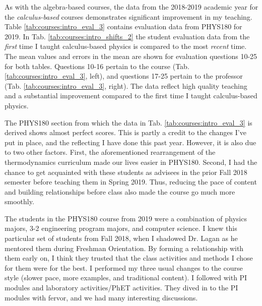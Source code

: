 \documentclass[../../main.tex]{subfiles}
\begin{document}
As with the algebra-based courses, the data from the 2018-2019 academic year for the \textit{calculus-based} courses demonstrates significant improvement in my teaching.  Table \ref{tab:courses:intro_eval_3} contains evaluation data from PHYS180 for 2019.  In Tab. \ref{tab:courses:intro_shifts_2} the student evaluation data from the \textit{first} time I taught calculus-based physics is compared to the most \textit{recent} time.  The mean values and errors in the mean are shown for evaluation questions 10-25 for both tables.  Questions 10-16 pertain to the course (Tab. \ref{tab:courses:intro_eval_3}, left), and questions 17-25 pertain to the professor (Tab. \ref{tab:courses:intro_eval_3}, right).  The data reflect high quality teaching and a substantial improvement compared to the first time I taught calculus-based physics. \\ \hspace{0.1cm}

The PHYS180 section from which the data in Tab. \ref{tab:courses:intro_eval_3} is derived shows almost perfect scores.  This is partly a credit to the changes I've put in place, and the reflecting I have done this past year.  However, it is also due to two other factors.  First, the aforementioned rearrangement of the thermodynamics curriculum made our lives easier in PHYS180.  Second, I had the chance to get acquainted with these students as advisees in the prior Fall 2018 semester before teaching them in Spring 2019.  Thus, reducing the pace of content and building relationships before class also made the course go much more smoothly. \\ \hspace{0.1cm}

\clearpage

The students in the PHYS180 course from 2019 were a combination of physics majors, 3-2 engineering program majors, and computer science.  I knew this particular set of students from Fall 2018, when I shadowed Dr. Lagan as he mentored them during Freshman Orientation.  By forming a relationship with them early on, I think they trusted that the class activities and methods I chose for them were for the best.  I performed my three usual changes to the course style (slower pace, more examples, and traditional content).  I followed with PI modules and laboratory activities/PhET activities.  They dived in to the PI modules with fervor, and we had many interesting discussions. \\ \hspace{0.1cm}
\end{document}
